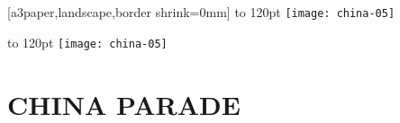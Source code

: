 \documentclass[twoside]{book}
\makeatletter
\providecommand{\cleartoevenpage}[1][\@empty]{%
 \clearpage%
 \ifodd\c@page\null#1\clearpage\fi}
\makeatother
\begin{document}
\mainmatter
\null\newpage
{}[a3paper,landscape,border shrink=0mm]
\cleartoevenpage
\checkoddpage%
{\parindent0pt
\vbox to 120pt{\lipsum[1]}%
\texttt{[image: china-05]}}

{\parindent0pt
\vbox to 120pt{\lipsum[1]}%
\hspace*{\dimexpr(-2in-\textwidth-2\evensidemargin)}
\texttt{[image: china-05]}}
\hspace{2.8em}\parbox[b]{0.571\textwidth}{%
\section*{\hfill CHINA PARADE \hfill\hfill}
\lipsum[1-3]}
\end{document}
